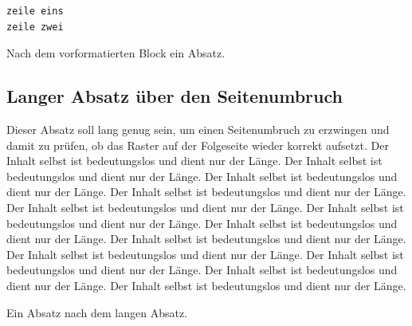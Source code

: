 \documentclass{swisstex}
\begin{document}
\begin{verbatim}
zeile eins
zeile zwei
\end{verbatim}

Nach dem vorformatierten Block ein Absatz.

\subsection{Langer Absatz über den Seitenumbruch}

Dieser Absatz soll lang genug sein, um einen Seitenumbruch zu erzwingen und
damit zu prüfen, ob das Raster auf der Folgeseite wieder korrekt aufsetzt.
Der Inhalt selbst ist bedeutungslos und dient nur der Länge. Der Inhalt
selbst ist bedeutungslos und dient nur der Länge. Der Inhalt selbst ist
bedeutungslos und dient nur der Länge. Der Inhalt selbst ist bedeutungslos
und dient nur der Länge. Der Inhalt selbst ist bedeutungslos und dient nur
der Länge. Der Inhalt selbst ist bedeutungslos und dient nur der Länge. Der
Inhalt selbst ist bedeutungslos und dient nur der Länge. Der Inhalt selbst
ist bedeutungslos und dient nur der Länge. Der Inhalt selbst ist
bedeutungslos und dient nur der Länge. Der Inhalt selbst ist bedeutungslos
und dient nur der Länge. Der Inhalt selbst ist bedeutungslos und dient nur
der Länge. Der Inhalt selbst ist bedeutungslos und dient nur der Länge.

Ein Absatz nach dem langen Absatz.
\end{document}
